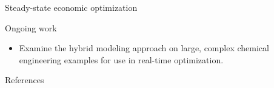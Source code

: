 \documentclass[xcolor=dvipsnames, 8pt]{beamer} %
\begin{document}
\begin{frame}{Steady-state economic optimization}
\begin{block}{Ongoing work}

\begin{itemize}
\item Examine the hybrid modeling approach on large, complex chemical
engineering examples for use in real-time optimization.
\end{itemize}

\end{block}

\end{frame}

\begin{frame}{References}


\end{frame}
\end{document}
